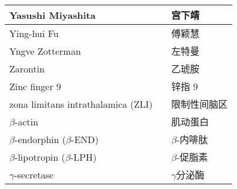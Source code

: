 \begin{longtable}{lll}
	\midrule
	Yasushi Miyashita && 宫下靖  \\
	
	\midrule
	Ying-hui Fu && 傅颖慧  \\
	
	\midrule
	Yngve Zotterman && 左特曼  \\
	
	\midrule
	Zarontin && 乙琥胺  \\
	
	\midrule
	Zinc finger 9 && 锌指 9  \\
	
	\midrule
	zona limitans intrathalamica (ZLI) && 限制性间脑区  \\
	
	\midrule
	$\beta$-actin && 肌动蛋白  \\
	
	\midrule
	$\beta$-endorphin ($\beta$-END) && $\beta$-内啡肽  \\
	
	\midrule
	$\beta$-lipotropin ($\beta$-LPH) && $\beta$-促脂素  \\
	
	\midrule
	$\gamma$-secretase && $\gamma$分泌酶  \\
	
	
	
	\bottomrule  

\end{longtable}

